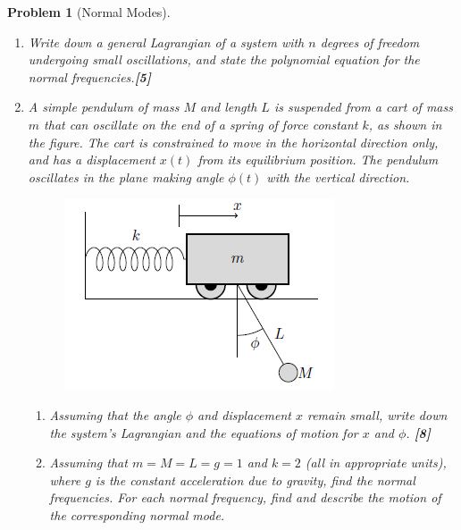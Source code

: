 \documentclass[a4paper]{article}
\theoremstyle{new}
\newtheorem{qns}{Problem}[section]
\begin{document}
\begin{qns}[Normal Modes]\leavevmode
\begin{enumerate}[label=(\alph*)]
\item Write down a general Lagrangian of a system with $n$ degrees of freedom undergoing small oscillations, and state the polynomial equation for the normal frequencies.\hfill\textbf{[5]}
\item A simple pendulum of mass $M$ and length $L$ is suspended from a cart of mass $m$ that can oscillate on the end of a spring of force constant $k$, as shown in the figure. The cart is constrained to move in the horizontal direction only, and has a displacement $x(t)$ from its equilibrium position. The pendulum oscillates in the plane making angle $\phi(t)$ with the vertical direction.
\begin{figure}[H]
    \centering
    \includegraphics[scale=0.95]{2018P2Q7.PNG}
\end{figure}
\begin{enumerate}[label=(\roman*)]
\item Assuming that the angle $\phi$ and displacement $x$ remain small, write down the system’s Lagrangian and the equations of motion for $x$ and $\phi$. \hfill\textbf{[8]}
\item Assuming that $m = M = L = g = 1$ and $k = 2$ (all in appropriate units), where $g$ is the constant acceleration due to gravity, find the normal frequencies. For each normal frequency, find and describe the motion of the corresponding normal mode.
\end{enumerate}
\end{enumerate}
\end{qns}
\newpage
\end{document}
